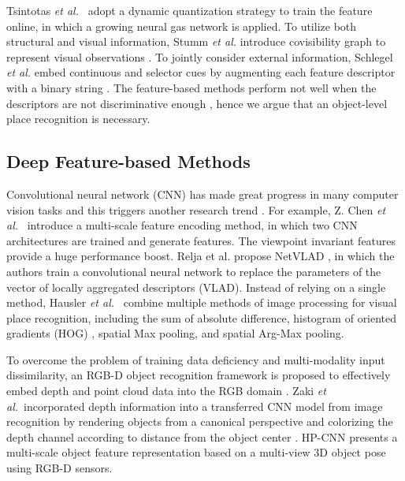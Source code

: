 \documentclass[letterpaper, 10 pt, journal, twoside]{IEEEtran}  %
\newcommand{\etal}{\textit{et al.}~}
\begin{document}
Tsintotas \etal \cite{tsintotas2018assigning} adopt a dynamic quantization strategy to train the feature online, in which a growing neural gas \cite{fritzke1995growing} network is applied.
To utilize both structural and visual information, Stumm \textit{et al.} introduce covisibility graph to represent visual observations \cite{stumm2016robust}.
To jointly consider external information, Schlegel \textit{et al.} embed continuous and selector cues by augmenting each feature descriptor with a binary string \cite{schlegel2019adding}.
The feature-based methods perform not well when the descriptors are not discriminative enough \cite{geiger2012we}, hence we argue that an object-level place recognition is necessary.


\subsection{Deep Feature-based Methods}

Convolutional neural network (CNN) has made great progress in many computer vision tasks and this triggers another research trend \cite{wang2019kervolutional}. For example, Z. Chen \etal \cite{chen2017deep} introduce a multi-scale feature encoding method, in which two CNN architectures are trained and generate features. The viewpoint invariant features provide a huge performance boost. Relja et al. propose NetVLAD \cite{arandjelovic2016netvlad}, in which the authors train a convolutional neural network to replace the parameters of the vector of locally aggregated descriptors (VLAD). Instead of relying on a single method, Hausler \etal \cite{hausler2019multi} combine multiple methods of image processing for visual place recognition, including the sum of absolute difference, histogram of oriented gradients (HOG) \cite{dalal2005histograms}, spatial Max pooling, and spatial Arg-Max pooling.

To overcome the problem of training data deficiency and multi-modality input dissimilarity, an RGB-D object recognition framework is proposed to effectively embed depth and point cloud data into the RGB domain \cite{zaki2016convolutional}.
Zaki \etal incorporated depth information into a transferred CNN model from image recognition by rendering objects from a canonical perspective and colorizing the depth channel according to distance from the object center \cite{schwarz2015rgb}.
HP-CNN \cite{zaki2019viewpoint} presents a multi-scale object feature representation based on a multi-view 3D object pose using RGB-D sensors.
\end{document}
